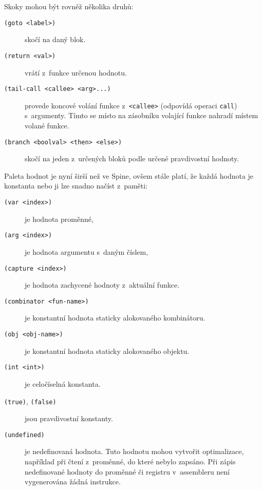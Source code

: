 Skoky mohou být rovněž několika druhů:

\begin{description}
  \item[\texttt{(goto <label>)}] skočí na daný blok.
  \item[\texttt{(return <val>)}] vrátí z~funkce určenou hodnotu.
  \item[\texttt{(tail-call <callee> <arg>...)}] provede koncové volání funkce
    z~\texttt{<callee>} (odpovídá operaci \texttt{call}) s~argumenty. Tímto se
    místo na zásobníku volající funkce nahradí místem volané funkce.
  \item[\texttt{(branch <boolval> <then> <else>)}] skočí na jeden z~určených
    bloků podle určené pravdivostní hodnoty.
\end{description}

Paleta hodnot je nyní širší než ve Spine, ovšem stále platí, že každá hodnota je
konstanta nebo ji lze snadno načíst z~paměti:

\begin{description}
  \item[\texttt{(var <index>)}] je hodnota proměnné,
  \item[\texttt{(arg <index>)}] je hodnota argumentu s~daným číslem,
  \item[\texttt{(capture <index>)}] je hodnota zachycené hodnoty z~aktuální funkce.
  \item[\texttt{(combinator <fun-name>)}] je konstantní hodnota staticky
    alokovaného kombinátoru.
  \item[\texttt{(obj <obj-name>)}] je konstantní hodnota staticky alokovaného
    objektu.
  \item[\texttt{(int <int>)}] je celočíselná konstanta.
  \item[\texttt{(true)}, \texttt{(false)}] jsou pravdivostní konstanty.
  \item[\texttt{(undefined)}] je nedefinovaná hodnota. Tuto hodnotu mohou
    vytvořit optimalizace, například při čtení z~proměnné, do které nebylo
    zapsáno. Při zápis nedefinované hodnoty do proměnné či registru v~assembleru
    není vygenerována žádná instrukce.
\end{description}
